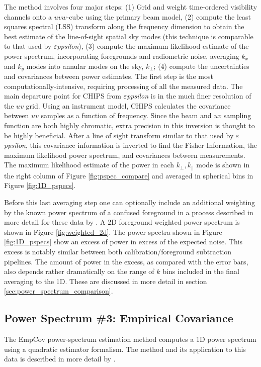 \documentclass[twolcolumn,iop]{emulateapj}
\def\eppsilon{{\it $\varepsilon$ppsilon}}
\def\empirical{EmpCov}
\def\chipscite{\cite{2016arXiv160102073T}}
\def\dilloncite{\cite{PhysRevD.91.123011} }
\begin{document}
The method involves four major steps: (1) Grid and weight time-ordered visibility channels onto a $uvw$-cube using the primary beam model, (2) compute the least squares spectral (LSS) transform along the frequency dimension to obtain the best estimate of the line-of-sight spatial sky modes (this technique is comparable to that used by \eppsilon), (3) compute the maximum-likelihood estimate of the power spectrum, incorporating foregrounds and radiometric noise,  averaging $k_x$ and $k_y$ modes into annular modes on the sky, $k_\bot$; (4) compute the uncertainties and covariances between power estimates. The first step is the most computationally-intensive, requiring processing of all the measured data. The main departure point for CHIPS from \eppsilon{} is in the much finer resolution of the $uv$ grid.  Using an instrument model, CHIPS calculates the covariance between $uv$ samples as a function of frequency.  Since the beam and $uv$ sampling function are both highly chromatic, extra precision in this inversion is thought to be highly beneficial. After a line of sight transform similar to that used by \eppsilon{}, this covariance information is inverted to find the Fisher Information, the maximum likelihood power spectrum, and covariances between measurements.  The maximum likelihood estimate of the power in each $k_\bot,k_\parallel$ mode is shown in the right column of Figure \ref{fig:pspec_compare} and averaged in spherical bins in Figure \ref{fig:1D_pspecs}. 

Before this last averaging step one can optionally include an additional weighting by the known power spectrum of a confused foreground in a process described in more detail for these data by \chipscite{}.  A 2D foreground weighted power spectrum is shown in Figure \ref{fig:weighted_2d}. The power spectra shown in Figure \ref{fig:1D_pspecs} show an excess of power in excess of the expected noise. This excess is notably similar between both calibration/foreground subtraction pipelines. The amount of power in the excess, as compared with the error bars, also depends rather dramatically on the range of $k$ bins included in the final averaging to the 1D.  These are discussed in more detail in section \ref{sec:power_spectrum_comparison}.

\subsection{Power Spectrum \#3: Empirical Covariance}
\label{sec:empirical_cov}

The \empirical{} power-spectrum estimation method computes a 1D power spectrum using a quadratic estimator formalism. The method and its application to this data is described in more detail by \dilloncite{}.
\end{document}
